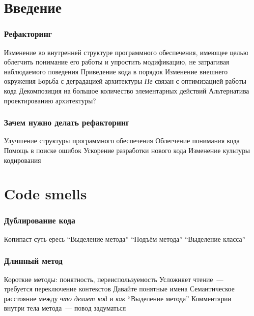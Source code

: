 \documentclass{../../slides-style}
\begin{document}
    \begin{frame}[plain]
        \titlepage
    \end{frame}

    \section{Введение}

    \begin{frame}
        \frametitle{Рефакторинг}
        \begin{outline}
            \1 Изменение во внутренней структуре программного обеспечения, имеющее целью облегчить понимание его работы и упростить модификацию, не затрагивая наблюдаемого поведения
                \2 Приведение кода в порядок
                \2 Изменение внешнего окружения
                \2 Борьба с деградацией архитектуры
                \2 \emph{Не} связан с оптимизацией работы кода
            \1 Декомпозиция на большое количество элементарных действий
            \1 Альтернатива проектированию архитектуры?
        \end{outline}
    \end{frame}

    \begin{frame}
        \frametitle{Зачем нужно делать рефакторинг}
        \begin{outline}
            \1 Улучшение структуры программного обеспечения
            \1 Облегчение понимания кода
            \1 Помощь в поиске ошибок
            \1 Ускорение разработки нового кода
            \1 Изменение культуры кодирования
        \end{outline}
    \end{frame}

    \section{Code smells}

    \begin{frame}
        \frametitle{Дублирование кода}
        \begin{outline}
            \1 Копипаст суть ересь
            \1 ``Выделение метода''
            \1 ``Подъём метода''
            \1 ``Выделение класса''
        \end{outline}
    \end{frame}

    \begin{frame}
        \frametitle{Длинный метод}
        \begin{outline}
            \1 Короткие методы: понятность, переиспользуемость
            \1 Усложняет чтение~--- требуется переключение контекстов
                \2 Давайте понятные имена
            \1 Семантическое расстояние между \emph{что делает код} и \emph{как}
            \1 ``Выделение метода''
            \1 Комментарии внутри тела метода~--- повод задуматься
        \end{outline}
    \end{frame}
\end{document}
